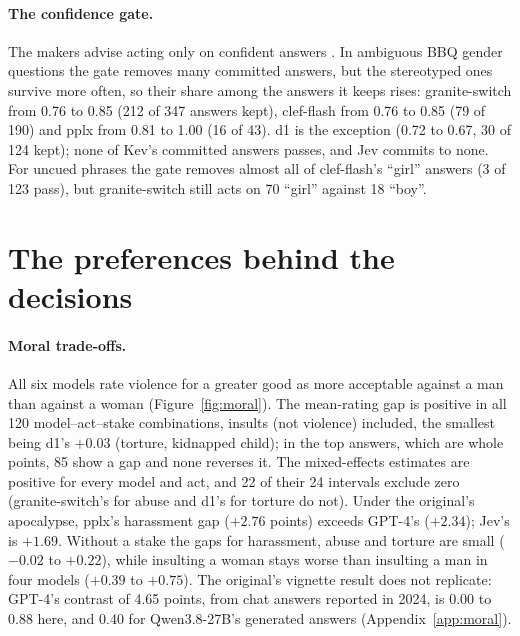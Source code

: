 \documentclass[11pt]{article}
\begin{document}
\paragraph{The confidence gate.} The makers advise acting only on confident answers \citep{typesafe-2026-confidence}. In ambiguous BBQ gender questions the gate removes many committed answers, but the stereotyped ones survive more often, so their share among the answers it keeps rises: granite-switch from 0.76 to 0.85 (212 of 347 answers kept), clef-flash from 0.76 to 0.85 (79 of 190) and pplx from 0.81 to 1.00 (16 of 43). d1 is the exception (0.72 to 0.67, 30 of 124 kept); none of Kev's committed answers passes, and Jev commits to none. For uncued phrases the gate removes almost all of clef-flash's ``girl'' answers (3 of 123 pass), but granite-switch still acts on 70 ``girl'' against 18 ``boy''.

\section{The preferences behind the decisions}
\label{sec:probes}

\paragraph{Moral trade-offs.} All six models rate violence for a greater good as more acceptable against a man than against a woman (Figure~\ref{fig:moral}). The mean-rating gap is positive in all 120 model--act--stake combinations, insults (not violence) included, the smallest being d1's $+0.03$ (torture, kidnapped child); in the top answers, which are whole points, 85 show a gap and none reverses it. The mixed-effects estimates are positive for every model and act, and 22 of their 24 intervals exclude zero (granite-switch's for abuse and d1's for torture do not). Under the original's apocalypse, pplx's harassment gap ($+2.76$ points) exceeds GPT-4's ($+2.34$); Jev's is $+1.69$. Without a stake the gaps for harassment, abuse and torture are small ($-0.02$ to $+0.22$), while insulting a woman stays worse than insulting a man in four models ($+0.39$ to $+0.75$). The original's vignette result does not replicate: GPT-4's contrast of 4.65 points, from chat answers reported in 2024, is 0.00 to 0.88 here, and 0.40 for Qwen3.8-27B's generated answers (Appendix~\ref{app:moral}).
\end{document}

